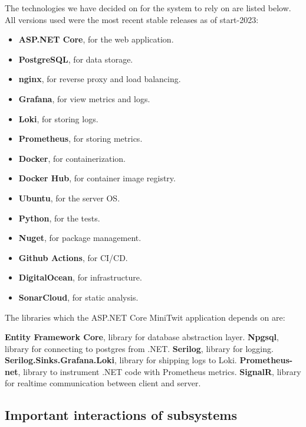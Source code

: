 The technologies we have decided on for the system to rely on are listed below. All versions used were the most recent stable releases as of start-2023:

\begin{itemize}
    \item \textbf{ASP.NET Core}, for the web application.
    \item \textbf{PostgreSQL}, for data storage.
    \item \textbf{nginx}, for reverse proxy and load balancing.
    \item \textbf{Grafana}, for view metrics and logs.
    \item \textbf{Loki}, for storing logs.
    \item \textbf{Prometheus}, for storing metrics.
    \item \textbf{Docker}, for containerization.
    \item \textbf{Docker Hub}, for container image registry.
    \item \textbf{Ubuntu}, for the server OS.
    \item \textbf{Python}, for the tests.
    \item \textbf{Nuget}, for package management.
    \item \textbf{Github Actions}, for CI/CD.
    \item \textbf{DigitalOcean}, for infrastructure.
    \item \textbf{SonarCloud}, for static analysis.
\end{itemize}

\noindent The libraries which the ASP.NET Core MiniTwit application depends on are:

\begin{outline}
    \1 \textbf{Entity Framework Core}, library for database abstraction layer.
    \1 \textbf{Npgsql}, library for connecting to postgres from .NET.
    \1 \textbf{Serilog}, library for logging.
    \1 \textbf{Serilog.Sinks.Grafana.Loki}, library for shipping logs to Loki.
    \1 \textbf{Prometheus-net}, library to instrument .NET code with Prometheus metrics.
    \1 \textbf{SignalR}, library for realtime communication between client and server.
\end{outline}

\subsection{Important interactions of subsystems}


